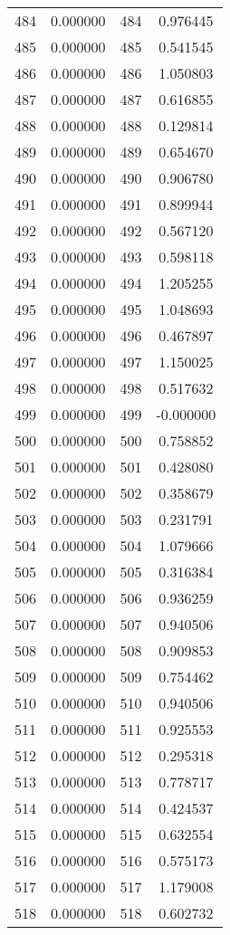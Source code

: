 \documentclass[12pt]{article}
\begin{document}
\begin{longtable}{@{}cccc@{}}
484 & 0.000000 & 484 & 0.976445 \\
485 & 0.000000 & 485 & 0.541545 \\
486 & 0.000000 & 486 & 1.050803 \\
487 & 0.000000 & 487 & 0.616855 \\
488 & 0.000000 & 488 & 0.129814 \\
489 & 0.000000 & 489 & 0.654670 \\
490 & 0.000000 & 490 & 0.906780 \\
491 & 0.000000 & 491 & 0.899944 \\
492 & 0.000000 & 492 & 0.567120 \\
493 & 0.000000 & 493 & 0.598118 \\
494 & 0.000000 & 494 & 1.205255 \\
495 & 0.000000 & 495 & 1.048693 \\
496 & 0.000000 & 496 & 0.467897 \\
497 & 0.000000 & 497 & 1.150025 \\
498 & 0.000000 & 498 & 0.517632 \\
499 & 0.000000 & 499 & -0.000000 \\
500 & 0.000000 & 500 & 0.758852 \\
501 & 0.000000 & 501 & 0.428080 \\
502 & 0.000000 & 502 & 0.358679 \\
503 & 0.000000 & 503 & 0.231791 \\
504 & 0.000000 & 504 & 1.079666 \\
505 & 0.000000 & 505 & 0.316384 \\
506 & 0.000000 & 506 & 0.936259 \\
507 & 0.000000 & 507 & 0.940506 \\
508 & 0.000000 & 508 & 0.909853 \\
509 & 0.000000 & 509 & 0.754462 \\
510 & 0.000000 & 510 & 0.940506 \\
511 & 0.000000 & 511 & 0.925553 \\
512 & 0.000000 & 512 & 0.295318 \\
513 & 0.000000 & 513 & 0.778717 \\
514 & 0.000000 & 514 & 0.424537 \\
515 & 0.000000 & 515 & 0.632554 \\
516 & 0.000000 & 516 & 0.575173 \\
517 & 0.000000 & 517 & 1.179008 \\
518 & 0.000000 & 518 & 0.602732 \\

\end{longtable}
\end{document}
